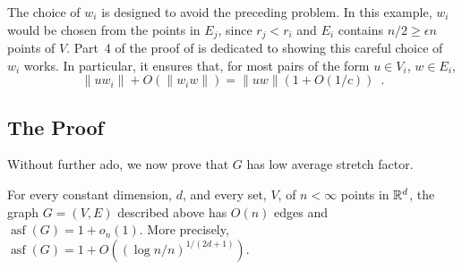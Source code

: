 \documentclass{patmorin}
\DeclareMathOperator{\asf}{asf}
\begin{document}
The choice of $w_i$ is designed to avoid the preceding problem.  In this
example, $w_i$ would be chosen from the points in $E_j$, since $r_j <
r_i$ and $E_i$ contains $n/2\ge \epsilon n$ points of $V$.  Part~4 of
the proof of  is dedicated to showing this careful
choice of $w_i$ works.  In particular, it ensures that, for most pairs
of the form $u\in V_i$, $w\in E_i$,
\[
    \|uw_i\| + O(\|w_iw\|) = \|uw\|(1+O(1/c)) \enspace .
\]




\subsection{The Proof}

Without further ado, we now prove that $G$ has low average stretch factor.

\begin{thm}
  For every constant dimension, $d$, and every set, $V$, of
  $n<\infty$ points in $\mathbb{R}^d$, the graph $G=(V,E)$ described above
  has $O(n)$ edges and $\asf(G)=1+o_n(1)$.  More precisely,
  $\asf(G)=1+O((\log n/n)^{1/(2d+1)})$.
\end{thm}
\end{document}
